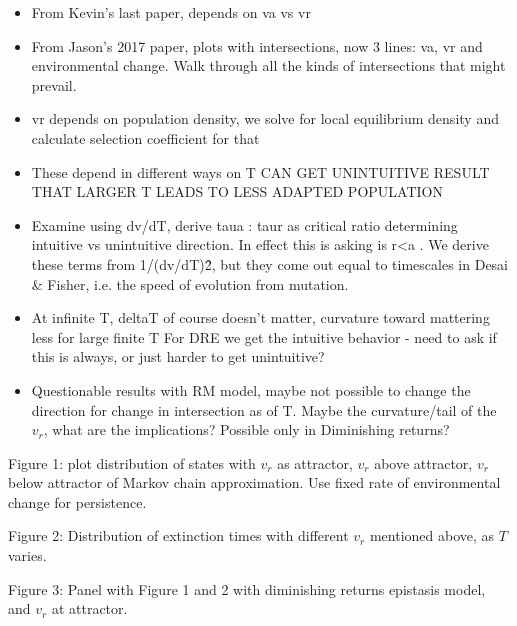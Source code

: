 \documentclass[9pt,twocolumn,twoside]{article}
\begin{document}
\begin{itemize}
\item From Kevin’s last paper, depends on va vs vr
\item From Jason’s 2017 paper, plots with intersections, now 3 lines: va, vr and environmental change. Walk through all the kinds of intersections that might prevail.
\item vr depends on population density, we solve for local equilibrium density and calculate selection coefficient for that
\item These depend in different ways on T
CAN GET UNINTUITIVE RESULT THAT LARGER T LEADS TO LESS ADAPTED POPULATION
\item Examine using dv/dT, derive taua : taur as critical ratio determining intuitive vs unintuitive direction. In effect this is asking is r<a . We derive these terms from 1/(dv/dT)\^2, but they come out equal to timescales in Desai \& Fisher, i.e. the speed of evolution from mutation.
\item At infinite T, deltaT of course doesn’t matter, curvature toward mattering less for large finite T
For DRE we get the intuitive behavior - need to ask if this is always, or just harder to get unintuitive?
\item Questionable results with RM model, maybe not possible to change the direction for change in intersection as of T. Maybe the curvature/tail of the $v_r$, what are the implications? Possible only in Diminishing returns?
\end{itemize}


Figure 1: plot distribution of states with $v_r$ as attractor, $v_r$ above attractor, $v_r$ below attractor of Markov chain approximation. Use fixed rate of environmental change for persistence.

Figure 2: Distribution of extinction times with different $v_r$ mentioned above, as $T$ varies.

Figure 3: Panel with Figure 1 and 2 with diminishing returns epistasis model, and $v_r$ at attractor.
\end{document}
